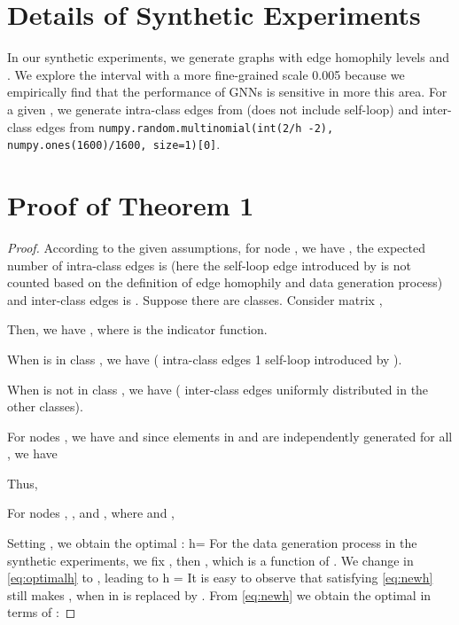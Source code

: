 \documentclass{article}
\newcommand{\beq}{}
\newcommand{\0}{{\boldsymbol{0}}}
\newcommand{\6}{{\partial}}
\newcommand{\8}{{\infty}}
\newcommand{\4}{{\nabla}}
\begin{document}
\section{Details of Synthetic Experiments}
\label{appendix:details_syn_exps}
In our synthetic experiments, we generate graphs with edge homophily levels  and . We explore the interval  with a more fine-grained scale 0.005 because we empirically find that the performance of GNNs is sensitive in more this area. For a given , we generate intra-class edges from  (does not include self-loop) and inter-class edges from \texttt{numpy.random.multinomial(int(2/h -2), numpy.ones(1600)/1600, size=1)[0]}.

\section{Proof of Theorem 1}
\label{appendix:proof_theorem1}
\begin{proof}


According to the given assumptions, for node , we have , the expected number of intra-class edges is  (here the self-loop edge introduced by  is not counted based on the definition of edge homophily and data generation process) and inter-class edges is . Suppose there are  classes. Consider matrix ,

Then, we have , where  is the indicator function.

When  is in class , we have  ( intra-class edges  1 self-loop introduced by ).

When  is not in class , we have  ( inter-class edges uniformly distributed in the other  classes).

\iffalse

where  is the indicator function. 
\fi
For nodes , we have  and since elements in  and  are independently generated for all , we have

Thus,


For nodes , , and ,
where  and , 

Setting , we obtain the optimal :
\beq \label{eq:optimalh}
h= 
\eeq
For the data generation process in the synthetic experiments, 
we fix , then , which is a function of .
We change  in \eqref{eq:optimalh} to , leading to
\beq \label{eq:newh}
h = 
\eeq
It is easy to observe that  satisfying \eqref{eq:newh} still makes , when  in  
is replaced by .
From \eqref{eq:newh} we obtain the optimal  in terms of :


\iffalse
Then using Markov's inequality, we have

\fi
\end{proof}
\end{document}
